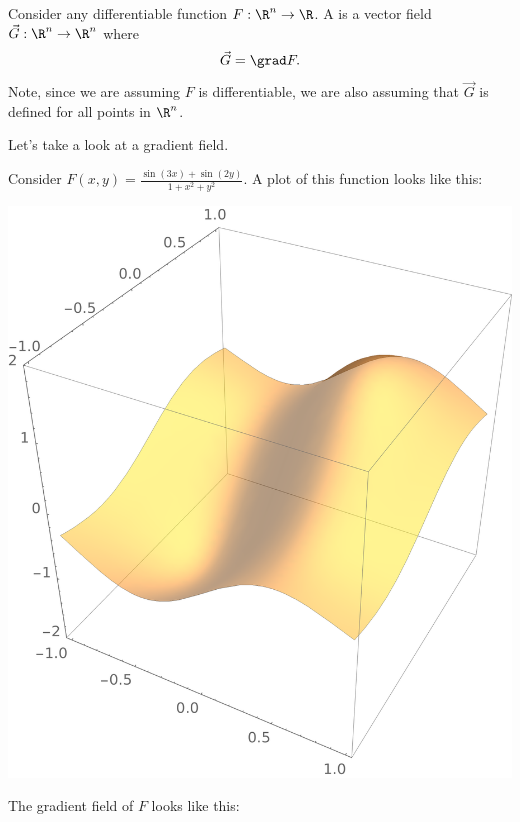 \documentclass{ximera}
\begin{document}
\begin{definition}
  Consider any differentiable function $F:\R^n\to \R$.
  A  is a vector field $\vec{G}:\R^n\to \R^n$ where
  \[
  \vec{G} = \grad F.
  \]
  Note, since we are assuming $F$ is differentiable, we are also
  assuming that $\vec{G}$ is defined for all points in $\R^n$.
\end{definition}

Let's take a look at a gradient field.


\begin{example}
  Consider $F(x,y) = \frac{\sin(3x)+\sin(2y)}{1+x^2+y^2}$. A plot of
  this function looks like this:
  \begin{image}
    \includegraphics{surf1.png}
  \end{image}
  The gradient field of $F$ looks like this:
  \begin{image}

\end{image}
\end{example}
\end{document}
